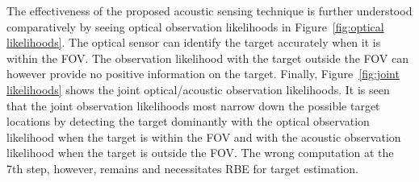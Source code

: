 The effectiveness of the proposed acoustic sensing technique is further understood comparatively by seeing optical observation likelihoods in Figure~\ref{fig:optical likelihoods}.  The optical sensor can identify the target accurately when it is within the FOV.  The observation likelihood with the target outside the FOV can however provide no positive information on the target.  Finally, Figure~\ref{fig:joint likelihoods} shows the joint optical/acoustic observation likelihoods.  It is seen that the joint observation likelihoods most narrow down the possible target locations by detecting the target dominantly with the optical observation likelihood when the target is within the FOV and with the acoustic observation likelihood when the target is outside the FOV.  The wrong computation at the 7th step, however, remains and necessitates RBE for target estimation.  

